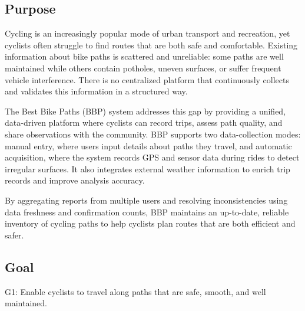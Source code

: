 \documentclass[11pt]{article}
\begin{document}
\setcounter{page}{2}


\newpage
{}
\tableofcontents
\newpage
{}
\listoffigures
{}
\listoftables

\clearpage
{}
\label{sect:introduction}

{\subsection{Purpose}}
Cycling is an increasingly popular mode of urban transport and recreation, yet cyclists often struggle to find routes that are both safe and comfortable. Existing information about bike paths is scattered and unreliable: some paths are well maintained while others contain potholes, uneven surfaces, or suffer frequent vehicle interference. There is no centralized platform that continuously collects and validates this information in a structured way.

The Best Bike Paths (BBP) system addresses this gap by providing a unified, data-driven platform where cyclists can record trips, assess path quality, and share observations with the community. BBP supports two data-collection modes: manual entry, where users input details about paths they travel, and automatic acquisition, where the system records GPS and sensor data during rides to detect irregular surfaces. It also integrates external weather information to enrich trip records and improve analysis accuracy.

By aggregating reports from multiple users and resolving inconsistencies using data freshness and confirmation counts, BBP maintains an up-to-date, reliable inventory of cycling paths to help cyclists plan routes that are both efficient and safer.

{\subsection{Goal}}
G1: Enable cyclists to travel along paths that are safe, smooth, and well maintained.
\end{document}
